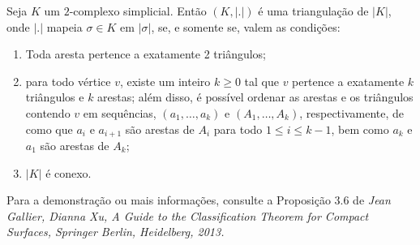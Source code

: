 \begin{prop}
    Seja $K$ um $2$-complexo simplicial. Então $(K,|.|)$ é uma triangulação de $|K|$, onde $|.|$ mapeia $\sigma \in K$ em $|\sigma|$, se, e somente se, valem as condições:
    \begin{enumerate}
        \item Toda aresta pertence a exatamente 2 triângulos;
        \item para todo vértice $v$, existe um inteiro $k\geq 0$ tal que $v$ pertence a exatamente $k$ triângulos e $k$ arestas; além disso, é possível ordenar as arestas e os triângulos contendo $v$ em sequências, $(a_1,\ldots,a_k)$ e $(A_1,\ldots,A_k)$, respectivamente, de como que $a_i$ e $a_{i+1}$ são arestas de $A_i$ para todo $1\leq i\leq k-1$, bem como $a_k$ e $a_1$ são arestas de $A_k$;
        \item $|K|$ é conexo.
    \end{enumerate}
\end{prop}

Para a demonstração ou mais informações, consulte a Proposição 3.6 de \textit{Jean Gallier, Dianna Xu, A Guide to the Classification Theorem for Compact Surfaces, Springer Berlin, Heidelberg, 2013.} 


